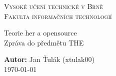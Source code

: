 \documentclass[12pt,a4paper,leqno]{article}
\begin{document}
\thispagestyle{empty}
	\begin{center}
	\textsc{\LARGE Vysoké učení technické v Brně}\\[1,5mm]
	\textsc{\Large Fakulta informačních technologií}\\
	\begin{figure}[!ht]
		\centering
	\end{figure}
	\LARGE{Teorie her a opensource}\\
    \large{Zpráva do předmětu THE}
	\end{center}
	{\Large{\textbf{Autor:}} Jan Ťulák (xtulak00)\vspace{5mm}}\\
	{\hfill \Large \today}\vspace{5mm}
\newpage

\end{document}
